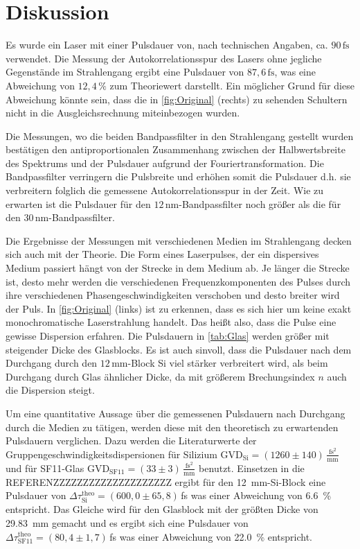 \newpage
\section{Diskussion}
\label{sec:disskussion}

Es wurde ein Laser mit einer Pulsdauer von, nach technischen Angaben, ca. $90\,\si{\femto\second}$ verwendet.
Die Messung der Autokorrelationsspur des Lasers ohne jegliche Gegenstände im Strahlengang ergibt eine Pulsdauer von $87,6\,\si{\femto\second}$, was eine Abweichung von $12,4\,\%$ zum Theoriewert darstellt.
Ein möglicher Grund für diese Abweichung könnte sein, dass die in \autoref{fig:Original} (rechts) zu sehenden Schultern nicht in die Ausgleichsrechnung miteinbezogen wurden.

Die Messungen, wo die beiden Bandpassfilter in den Strahlengang gestellt wurden bestätigen den antiproportionalen Zusammenhang zwischen der Halbwertsbreite des Spektrums und der Pulsdauer aufgrund der Fouriertransformation.
Die Bandpassfilter verringern die Pulsbreite und erhöhen somit die Pulsdauer d.h. sie verbreitern folglich die gemessene Autokorrelationsspur in der Zeit.
Wie zu erwarten ist die Pulsdauer für den $12\,\si{\nano\meter}$-Bandpassfilter noch größer als die für den $30\,\si{\nano\meter}$-Bandpassfilter.

Die Ergebnisse der Messungen mit verschiedenen Medien im Strahlengang decken sich auch mit der Theorie.
Die Form eines Laserpulses, der ein dispersives Medium passiert hängt von der Strecke in dem Medium ab.
Je länger die Strecke ist, desto mehr werden die verschiedenen Frequenzkomponenten des Pulses durch ihre verschiedenen Phasengeschwindigkeiten verschoben und desto breiter wird der Puls.
In \autoref{fig:Original} (links) ist zu erkennen, dass es sich hier um keine exakt monochromatische Laserstrahlung handelt.
Das heißt also, dass die Pulse eine gewisse Dispersion erfahren.
Die Pulsdauern in \autoref{tab:Glas} werden größer mit steigender Dicke des Glasblocks.
Es ist auch sinvoll, dass die Pulsdauer nach dem Durchgang durch den $12\,\si{\milli\meter}$-Block Si viel stärker verbreitert wird, als beim Durchgang durch Glas ähnlicher Dicke, da mit größerem Brechungsindex $n$ auch die Dispersion steigt.

Um eine quantitative Aussage über die gemessenen Pulsdauern nach Durchgang durch die Medien zu tätigen, werden diese mit den theoretisch zu erwartenden Pulsdauern verglichen.
Dazu werden die Literaturwerte der Gruppengeschwindigkeitsdispersionen für Silizium $\mathrm{GVD}_{\mathrm{Si}} = (1260 \pm 140)\, \frac{\mathrm{fs}^2}{\mathrm{mm}}$ und für SF11-Glas $\mathrm{GVD}_{\mathrm{SF11}} = (33 \pm 3)\, \frac{\mathrm{fs}^2}{\mathrm{mm}}$ benutzt.
Einsetzen in die REFERENZZZZZZZZZZZZZZZZZZZZ ergibt für den \qty{12}{mm}-Si-Block eine Pulsdauer von $\Delta\tau_{\mathrm{Si}}^{\mathrm{theo}} = (600,0 \pm 65,8)\,$fs was einer Abweichung von \qty{6,6}{\%} entspricht.
Das Gleiche wird für den Glasblock mit der größten Dicke von \qty{29,83}{mm} gemacht und es ergibt sich eine Pulsdauer von $\Delta\tau_{\mathrm{SF11}}^{\mathrm{theo}} = (80,4 \pm 1,7)\,$fs was einer Abweichung von \qty{22,0}{\%} entspricht.

